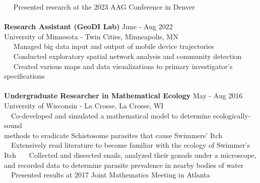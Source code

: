 \documentclass[letterpaper,12pt]{article}
\numberwithin{equation}{section}
\begin{document}
\hspace*{1.2in} \textbullet ~~ Presented research at the 2023 AAG Conference in Denver
\\\\
\hspace*{1.16in} \textbf{Research Assistant (GeoDI Lab)} \hspace*{2.4in} June - Aug 2022\\
\hspace*{1.16in} University of Minnesota - Twin Cities, Minneapolis, MN \vspace*{.1cm}\\
\hspace*{1.2in} \textbullet ~~ Managed big data input and output of mobile device trajectories\\
\hspace*{1.2in} \textbullet ~~ Conducted exploratory spatial network analysis and community detection\\
\hspace*{1.2in} \textbullet ~~ Created various maps and data visualizations to primary investigator's specifications
\\\\
\hspace*{1.16in} \textbf{Undergraduate Researcher in Mathematical Ecology} \hspace*{.76in} May - Aug 2016\\
\hspace*{1.16in} University of Wisconsin - La Crosse, La Crosse, WI \vspace*{.1cm}\\
\hspace*{1.2in} \textbullet ~~Co-developed and simulated a mathematical model to determine ecologically-sound \\\hspace*{1.6in} methods to eradicate Schistosome parasites that cause Swimmers' Itch \\
\hspace*{1.2in} \textbullet ~~Extensively read literature to become familiar with the ecology of Swimmer's Itch
\hspace*{1.2in} \textbullet ~~~Collected and dissected snails, analyzed their gonads under a microscope, \\
\hspace*{1.6in} and recorded data to determine parasite prevalence in nearby bodies of water\\
\hspace*{1.2in} \textbullet ~~Presented results at 2017 Joint Mathematics Meeting in Atlanta
\end{document}
